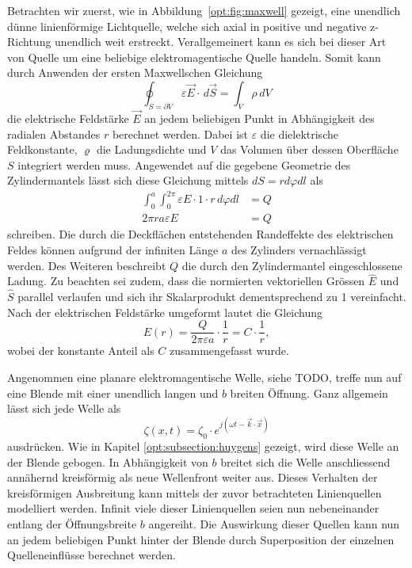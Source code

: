 Betrachten wir zuerst, wie in Abbildung~\ref{opt:fig:maxwell} gezeigt, eine unendlich dünne linienförmige Lichtquelle, welche sich axial in positive und negative z-Richtung unendlich weit erstreckt.
Verallgemeinert kann es sich bei dieser Art von Quelle um eine beliebige elektromagentische Quelle handeln.
Somit kann durch Anwenden der ersten Maxwellschen Gleichung
\begin{equation}
\oint_{S=\partial V} \varepsilon\vec{E} \cdot\, d\vec{S}
=
\int_{V}\rho\, dV
\end{equation}
die elektrische Feldstärke $\vec{E}$ an jedem beliebigen Punkt in Abhängigkeit des radialen Abstandes $r$ berechnet werden.
Dabei ist $\varepsilon$ die dielektrische Feldkonstante, $\varrho$ die Ladungsdichte und $V$ das Volumen über dessen Oberfläche $S$ integriert werden muss.
Angewendet auf die gegebene Geometrie des Zylindermantels lässt sich diese Gleichung mittels $dS = r d\varphi dl$ als
\begin{align}
\int_{0}^{a}\int_{0}^{2\pi} \varepsilon E\cdot 1 \cdot r\, d\varphi dl
&=
Q
\\
2\pi ra\varepsilon E
&=
Q
\end{align}
schreiben.
Die durch die Deckflächen entstehenden Randeffekte des elektrischen Feldes können aufgrund der infiniten Länge $a$ des Zylinders vernachlässigt werden.
Des Weiteren beschreibt $Q$ die durch den Zylindermantel eingeschlossene Ladung.
Zu beachten sei zudem, dass die normierten vektoriellen Grössen $\hat{E}$ und $\hat{S}$ parallel verlaufen und sich ihr Skalarprodukt dementsprechend zu 1 vereinfacht.
Nach der elektrischen Feldstärke umgeformt lautet die Gleichung
\begin{equation}
E(r)
=
\frac{Q}{2\pi\varepsilon a} \cdot \frac{1}{r}
=
C \cdot \frac{1}{r}
,
\label{opt:equation:E}
\end{equation}
wobei der konstante Anteil als $C$ zusammengefasst wurde.

Angenommen eine planare elektromagentische Welle, siehe TODO, treffe nun auf eine Blende mit einer unendlich langen und $b$ breiten Öffnung.
Ganz allgemein lässt sich jede Welle als
\begin{equation}
\zeta(x, t)
=
\zeta_0 \cdot e^{j(\omega t - \vec{k}\cdot\vec{x})}
\label{opt:equation:wave}
\end{equation}
ausdrücken.
Wie in Kapitel \ref{opt:subsection:huygens} gezeigt, wird diese Welle an der Blende gebogen.
In Abhängigkeit von $b$ breitet sich die Welle anschliessend annähernd kreisförmig als neue Wellenfront weiter aus.
Dieses Verhalten der kreisförmigen Ausbreitung kann mittels der zuvor betrachteten Linienquellen modelliert werden.
Infinit viele dieser Linienquellen seien nun nebeneinander entlang der Öffnungsbreite $b$ angereiht.
Die Auswirkung dieser Quellen kann nun an jedem beliebigen Punkt hinter der Blende durch Superposition der einzelnen Quelleneinflüsse berechnet werden.

